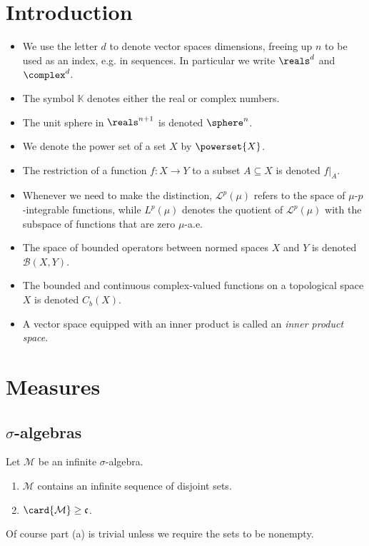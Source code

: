 \documentclass[article, a4paper, 11pt, oneside]{memoir}
\title{\doctitle}
\author{\docauthor}
\numberwithin{equation}{chapter}
\newcommand{\calB}{\mathcal{B}}
\newcommand{\calM}{\mathcal{M}}
\newcommand{\calL}{\mathcal{L}}
\newcommand{\bbK}{\mathbb{K}}
\theoremstyle{nonumberplain}
\begin{document}
\maketitle

\setcounter{chapter}{-1}
\chapter{Introduction}

\begin{itemize}
	\item We use the letter $d$ to denote vector spaces dimensions, freeing up $n$ to be used as an index, e.g. in sequences. In particular we write $\reals^d$ and $\complex^d$.
	\item The symbol $\bbK$ denotes either the real or complex numbers.
	\item The unit sphere in $\reals^{n+1}$ is denoted $\sphere^n$.
	\item We denote the power set of a set $X$ by $\powerset{X}$.
	\item The restriction of a function $f \colon X \to Y$ to a subset $A \subseteq X$ is denoted $f|_A$.
	\item Whenever we need to make the distinction, $\calL^p(\mu)$ refers to the space of $\mu$-$p$-integrable functions, while $L^p(\mu)$ denotes the quotient of $\calL^p(\mu)$ with the subspace of functions that are zero $\mu$-a.e.
	\item The space of bounded operators between normed spaces $X$ and $Y$ is denoted $\calB(X,Y)$.
	\item The bounded and continuous complex-valued functions on a topological space $X$ is denoted $C_b(X)$.
	\item A vector space equipped with an inner product is called an \emph{inner product space}.
\end{itemize}




\chapter{Measures}

\addtocounter{section}{1}
\section[Sigma-algebras][$\sigma$-algebras]{$\sigma$-algebras}

\begin{exerciseframed*}[1]
    Let $\calM$ be an infinite $\sigma$-algebra.
    \begin{enumerate}
        \item $\calM$ contains an infinite sequence of disjoint sets.
        \item $\card{\calM} \geq \mathfrak{c}$.
    \end{enumerate}
\end{exerciseframed*}
%
Of course part (a) is trivial unless we require the sets to be nonempty.
\end{document}
